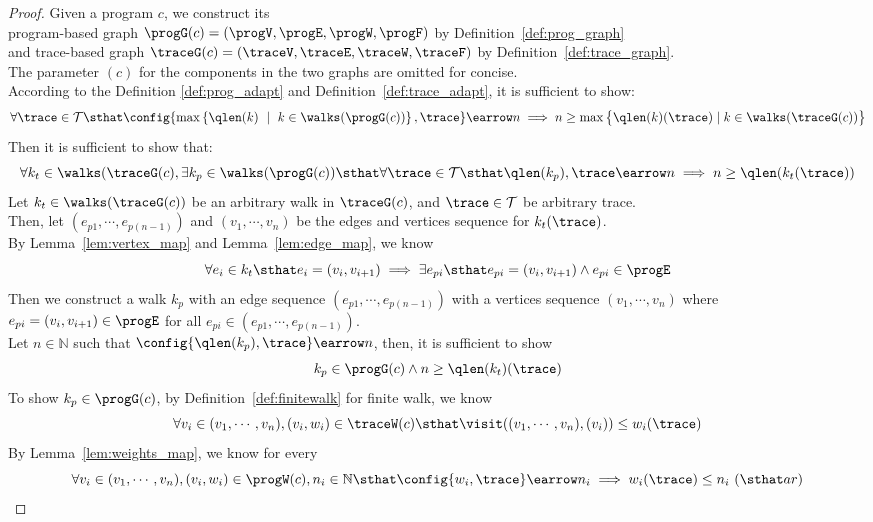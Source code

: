 \begin{proof}
Given a program ${c}$, 
we construct its 
\\
program-based graph $\progG({c}) = (\progV, \progE, \progW, \progF)$
by Definition~\ref{def:prog_graph}
\\ and 
trace-based graph $\traceG({c}) = (\traceV, \traceE, \traceW, \traceF)$  by Definition~\ref{def:trace_graph}.
\\
The parameter $(c)$ for the components in the two graphs are omitted for concise.
\\
%
According to the Definition \ref{def:prog_adapt} and Definition~\ref{def:trace_adapt}, it is sufficient to show:
%
$$
\forall \trace \in \mathcal{T} \sthat 
\config{\max\left\{ \qlen(k) \ \mid \  k\in \walks(\progG({c}))\right \}
, \trace } \earrow n \implies
n \geq
\max \big 
\{ \qlen(k)(\trace) \mid k \in \walks(\traceG(c)) \big \} 
$$
%
%
Then it is sufficient to show that:
\[
  \forall 
  k_t \in \walks(\traceG({c}),
  \exists k_p \in \walks(\progG({c})) 
  \sthat  \forall \trace \in \mathcal{T} \sthat 
  \qlen(k_p), \trace \earrow n
   \implies 
  n \geq \qlen(k_t(\trace))
\]
%
Let $k_t\in \walks(\traceG(c))$ be an arbitrary walk in $\traceG(c)$, 
and $\trace \in \mathcal{T}$ be arbitrary trace.
\\
Then, 
let $(e_{p1}, \cdots, e_{p(n-1)}) $ and
$(v_1, \cdots, v_n)$ be the edges and vertices sequence  for $k_t(\trace)$.
\\
By Lemma~\ref{lem:vertex_map} and Lemma~\ref{lem:edge_map}, we know
%
\[
  \forall e_i \in k_t \sthat  e_i = (v_i, v_{i + 1}) \implies
  \exists e_{pi} \sthat  e_{pi} = (v_i, v_{i + 1}) \land e_{pi} \in \progE
  \]
Then we construct a walk $k_p$ with an edge sequence $(e_{p1}, \cdots, e_{p(n-1)}) $ 
with a vertices sequence $(v_1, \cdots, v_n)$ where 
$e_{pi} = (v_i, v_{i + 1}) \in \progE$ for all $e_{pi} \in (e_{p1}, \cdots, e_{p(n-1)})$.
\\
Let $n \in \mathbb{N}$ such that 
$\config{\qlen(k_p), \trace} \earrow n$,
then, it is sufficient to show
\[
  k_p \in \progG(c) \land n \geq \qlen(k_t)(\trace)
  \] 
To show $k_p \in \progG(c)$, by Definition~\ref{def:finitewalk} for finite walk, 
we know
\[
  \forall v_i \in (v_1, \cdots, v_n), (v_i, w_i) \in \traceW(c) 
  \sthat 
  \visit((v_1, \cdots, v_n), (v_i)) \leq w_i(\trace)
\]
%
By Lemma~\ref{lem:weights_map}, we know for every 
\[
  \forall v_i \in (v_1, \cdots, v_n), (v_i, w_i) \in \progW(c), n_i \in \mathbb{N} 
  \sthat 
  \config{w_i, \trace} \earrow n_i
  \implies
   w_i(\trace) \leq n_i ~ (\sthat ar)
\]
\end{proof}
